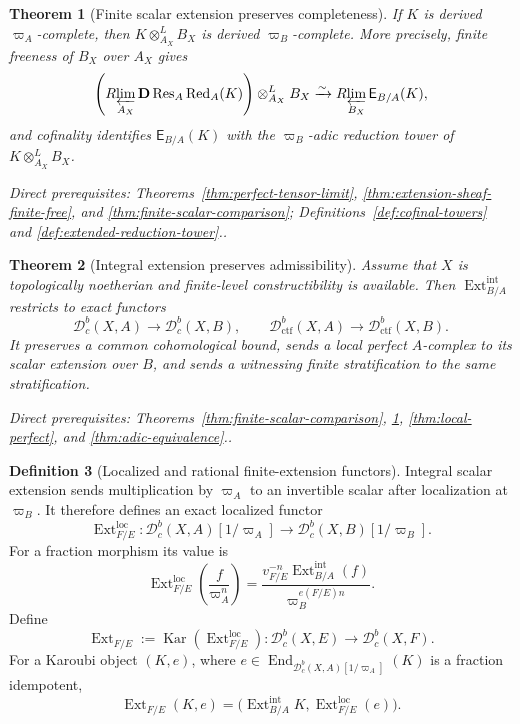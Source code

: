 \documentclass[10pt]{article}
\newtheorem{theorem}{Theorem}[section]
\theoremstyle{definition}
\newtheorem{definition}[theorem]{Definition}
\newcommand{\Dbc}{\mathcal D^b_c}
\newcommand{\Dctf}{\mathcal D^b_{\mathrm{ctf}}}
\newcommand{\End}{\operatorname{End}}
\newcommand{\Kar}{\operatorname{Kar}}
\newcommand{\Rlim}{R\!\varprojlim}
\newcommand{\depends}[1]{\par\smallskip\noindent\textit{Direct prerequisites:} #1.}
\begin{document}
\begin{theorem}[Finite scalar extension preserves completeness]
\label{thm:scalar-extension-complete}
If $K$ is derived $\varpi_A$-complete, then
$K\otimes^L_{A_X}B_X$ is derived $\varpi_B$-complete.  More precisely,
finite freeness of $B_X$ over $A_X$ gives
\[
 \left(\Rlim_{A_X}
   \mathbf D\operatorname{Res}_A\operatorname{Red}_A(K)\right)
   \otimes^L_{A_X}B_X
 \xrightarrow{\sim}
 \Rlim_{B_X}\mathsf E_{B/A}(K),
\]
and cofinality identifies $\mathsf E_{B/A}(K)$ with the $\varpi_B$-adic
reduction tower of $K\otimes^L_{A_X}B_X$.
\depends{Theorems~\ref{thm:perfect-tensor-limit},
\ref{thm:extension-sheaf-finite-free}, and
\ref{thm:finite-scalar-comparison}; Definitions~\ref{def:cofinal-towers}
and \ref{def:extended-reduction-tower}.}
\end{theorem}

\begin{theorem}[Integral extension preserves admissibility]
\label{thm:integral-extension-preserves}
Assume that $X$ is topologically noetherian and finite-level
constructibility is available.  Then
$\operatorname{Ext}^{\mathrm{int}}_{B/A}$ restricts to exact functors
\[
 \Dbc(X,A)\longrightarrow\Dbc(X,B),
 \qquad
 \Dctf(X,A)\longrightarrow\Dctf(X,B).
\]
It preserves a common cohomological bound, sends a local perfect
$A$-complex to its scalar extension over $B$, and sends a witnessing finite
stratification to the same stratification.
\depends{Theorems~\ref{thm:finite-scalar-comparison},
\ref{thm:scalar-extension-complete},
\ref{thm:local-perfect}, and \ref{thm:adic-equivalence}.}
\end{theorem}

\begin{definition}[Localized and rational finite-extension functors]
\label{def:rational-extension}
Integral scalar extension sends multiplication by $\varpi_A$ to an
invertible scalar after localization at $\varpi_B$.  It therefore defines
an exact localized functor
\[
 \operatorname{Ext}^{\mathrm{loc}}_{F/E}:
 \Dbc(X,A)[1/\varpi_A]\longrightarrow
 \Dbc(X,B)[1/\varpi_B].
\]
For a fraction morphism its value is
\[
 \operatorname{Ext}^{\mathrm{loc}}_{F/E}
 \left(\frac{f}{\varpi_A^n}\right)
 =\frac{v_{F/E}^{-n}\operatorname{Ext}^{\mathrm{int}}_{B/A}(f)}
        {\varpi_B^{e(F/E)n}}.
\]
Define
\[
 \operatorname{Ext}_{F/E}:=
 \Kar(\operatorname{Ext}^{\mathrm{loc}}_{F/E}):
 \Dbc(X,E)\longrightarrow\Dbc(X,F).
\]
For a Karoubi object $(K,e)$, where
$e\in\End_{\Dbc(X,A)[1/\varpi_A]}(K)$ is a fraction idempotent,
\[
 \operatorname{Ext}_{F/E}(K,e)=
 \bigl(\operatorname{Ext}^{\mathrm{int}}_{B/A}K,
       \operatorname{Ext}^{\mathrm{loc}}_{F/E}(e)\bigr).
\]
\end{definition}
\end{document}
